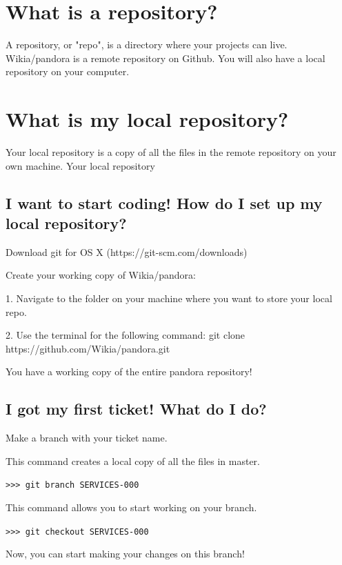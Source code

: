 \documentclass[oneside]{book}
\begin{document}
\section{What is a repository?}
A repository, or "repo", is a directory where your projects can live. Wikia/pandora is a remote repository on Github. You will also have a local repository on your computer. 
\section{What is my local repository?}
Your local repository is a copy of all the files in the remote repository on your own machine. Your local repository
\subsection{I want to start coding! How do I set up my local repository?}
\noindent Download git for OS X (https://git-scm.com/downloads)\par
\noindent Create your working copy of Wikia/pandora:\par
1. Navigate to the folder on your machine where you want to store your local repo.\par
2. Use the terminal for the following command: git clone https://github.com/Wikia/pandora.git \par
\noindent You have a working copy of the entire pandora repository!
\subsection{I got my first ticket! What do I do?}
\noindent Make a branch with your ticket name.\par
This command creates a local copy of all the files in master.\par
\texttt{>>> git branch SERVICES-000} \par
\noindent This command allows you to start working on your branch.\par
\texttt{>>> git checkout SERVICES-000} \par
\noindent Now, you can start making your changes on this branch!
\newpage
\end{document}
